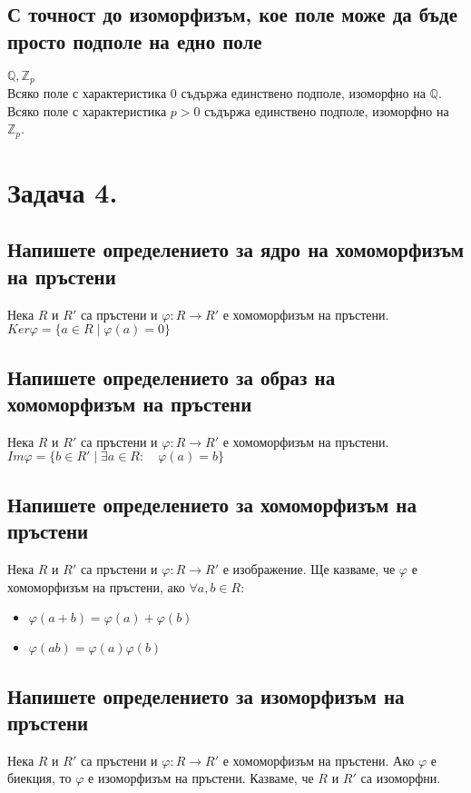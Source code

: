 \documentclass[10pt]{article}
\newcommand*{\Z}{\mathbb{Z}}
\newcommand*{\Q}{\mathbb{Q}}
\begin{document}
\subsection*{С точност до изоморфизъм, кое поле може да бъде просто подполе на едно поле}
$\Q, \Z_p$\\
Всяко поле с характеристика 0 съдържа единствено подполе, изоморфно на $\Q$.\\
Всяко поле с характеристика $p > 0$ съдържа единствено подполе, изоморфно на $\Z_p$.

\section*{Задача 4.}
\subsection*{Напишете определението за ядро на хомоморфизъм на пръстени}
Нека $R$ и $R'$ са пръстени и $\varphi: R \to R'$ е хомоморфизъм на пръстени. $Ker\varphi = \{a \in R \mid \varphi(a) = 0\}$

\subsection*{Напишете определението за образ на хомоморфизъм на пръстени}
Нека $R$ и $R'$ са пръстени и $\varphi: R \to R'$ е хомоморфизъм на пръстени. $Im\varphi = \{b \in R' \mid \exists a \in R: \quad \varphi(a) = b\}$

\subsection*{Напишете определението за хомоморфизъм на пръстени}
Нека $R$ и $R'$ са пръстени и $\varphi: R \to R'$ е изображение. Ще казваме, че $\varphi$ е хомоморфизъм на пръстени, ако $\forall a, b \in R$:
\begin{itemize}
	\item $\varphi(a + b) = \varphi(a) + \varphi(b)$
	\item $\varphi(ab) = \varphi(a)\varphi(b)$
\end{itemize}

\subsection*{Напишете определението за изоморфизъм на пръстени}
Нека $R$ и $R'$ са пръстени и $\varphi: R \to R'$ е хомоморфизъм на пръстени. Ако $\varphi$ е биекция, то $\varphi$ е изоморфизъм на пръстени. Казваме, че $R$ и $R'$ са изоморфни.
\end{document}
